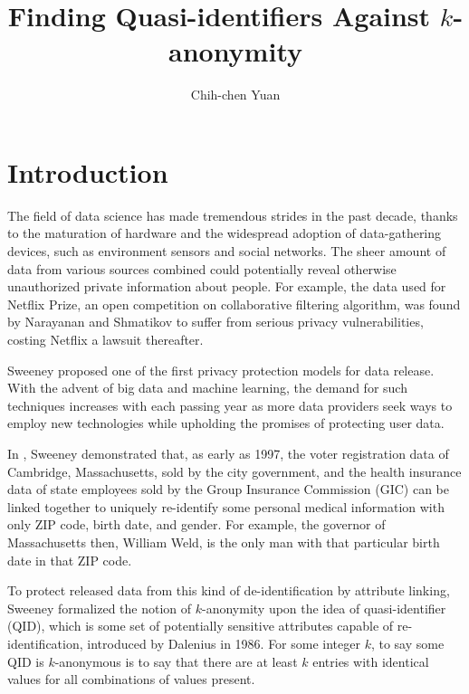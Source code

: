 \documentclass[12pt]{llncs}
\title{Finding Quasi-identifiers Against $k$-anonymity}
\author{Chih-chen Yuan}
\institute{National Taiwan Normal University, Taiwan}
\begin{document}
\maketitle

\begin{abstract}

\end{abstract}

\section{Introduction}

The field of data science has made tremendous strides in the past decade, thanks to the maturation of hardware and the widespread adoption of data-gathering devices, such as environment sensors and social networks. The sheer amount of data from various sources combined could potentially reveal otherwise unauthorized private information about people. For example, the data used for Netflix Prize, an open competition on collaborative filtering algorithm, was found by Narayanan and Shmatikov \cite{Narayanan:2008} to suffer from serious privacy vulnerabilities, costing Netflix a lawsuit thereafter.

Sweeney \cite{Sweeney:2002} proposed one of the first privacy protection models for data release. With the advent of big data and machine learning, the demand for such techniques increases with each passing year as more data providers seek ways to employ new technologies while upholding the promises of protecting user data.

In \cite{Sweeney:2002}, Sweeney demonstrated that, as early as 1997, the voter registration data of Cambridge, Massachusetts, sold by the city government, and the health insurance data of state employees sold by the Group Insurance Commission (GIC) can be linked together to uniquely re-identify some personal medical information with only ZIP code, birth date, and gender. For example, the governor of Massachusetts then, William Weld, is the only man with that particular birth date in that ZIP code.

To protect released data from this kind of de-identification by attribute linking, Sweeney formalized the notion of $k$-anonymity upon the idea of quasi-identifier (QID), which is some set of potentially sensitive attributes capable of re-identification, introduced by Dalenius \cite{Dalenius:1986} in 1986. For some integer $k$, to say some QID is $k$-anonymous is to say that there are at least $k$ entries with identical values for all combinations of values present.
\end{document}
